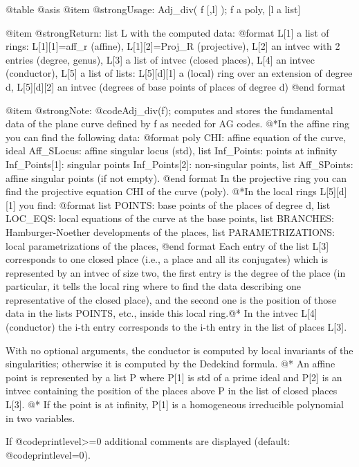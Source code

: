 @table @asis
@item @strong{Usage:}
Adj_div( f [,l] ); f a poly, [l a list]

@item @strong{Return:}
list L with the computed data:
  @format
  L[1] a list of rings: L[1][1]=aff_r (affine), L[1][2]=Proj_R (projective),
  L[2] an intvec with 2 entries (degree, genus),
  L[3] a list of intvec (closed places),
  L[4] an intvec (conductor),
  L[5] a list of lists:
     L[5][d][1] a (local) ring over an extension of degree d,
     L[5][d][2] an intvec (degrees of base points of places of degree d)
  @end format

@item @strong{Note:}
@code{Adj_div(f);} computes and stores the fundamental data of the
plane curve defined by f as needed for AG codes.
@*In the affine ring you can find the following data:
   @format
   poly CHI:  affine equation of the curve,
   ideal Aff_SLocus:  affine singular locus (std),
   list Inf_Points:  points at infinity
            Inf_Points[1]:  singular points
            Inf_Points[2]:  non-singular points,
   list Aff_SPoints:  affine singular points (if not empty).
   @end format
In the projective ring you can find the projective equation
CHI of the curve (poly).
@*In the local rings L[5][d][1] you find:
   @format
   list POINTS:  base points of the places of degree d,
   list LOC_EQS:  local equations of the curve at the base points,
   list BRANCHES:  Hamburger-Noether developments of the places,
   list PARAMETRIZATIONS:  local parametrizations of the places,
   @end format
Each entry of the list L[3] corresponds to one closed place (i.e.,
a place and all its conjugates) which is represented by an intvec
of size two, the first entry is the degree of the place (in
particular, it tells the local ring where to find the data
describing one representative of the closed place), and the
second one is the position of those data in the lists POINTS, etc.,
inside this local ring.@*
In the intvec L[4] (conductor) the i-th entry corresponds to the
i-th entry in the list of places L[3].

With no optional arguments, the conductor is computed by
local invariants of the singularities; otherwise it is computed
by the Dedekind formula. @*
An affine point is represented by a list P where P[1] is std
of a prime ideal and P[2] is an intvec containing the position
of the places above P in the list of closed places L[3]. @*
If the point is at infinity, P[1] is a homogeneous irreducible
polynomial in two variables.

If @code{printlevel>=0} additional comments are displayed (default:
@code{printlevel=0}).


